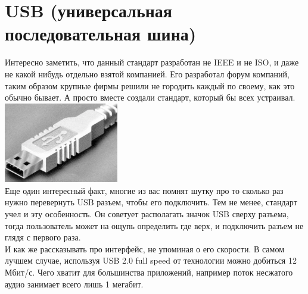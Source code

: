 \documentclass[12pt,a4paper]{article}
\begin{document}
\section{USB (универсальная последовательная шина)}
    Интересно заметить, что данный стандарт разработан не IEEE и не ISO, и
    даже не какой нибудь отдельно взятой компанией. Его разработал форум
    компаний, таким образом крупные фирмы решили не городить каждый по своему,
    как это обычно бывает. А просто вместе создали стандарт, который
    бы всех устраивал.\\
\includegraphics[width=5cm]{plug.png}\\
    Еще один интересный факт, многие из вас помнят шутку про то сколько раз нужно
    перевернуть USB разъем, чтобы его подключить. Тем не менее, стандарт
    учел и эту особенность. Он советует располагать значок USB сверху разъема,
    тогда пользователь может на ощупь определить где верх, и подключить разъем
    не глядя с первого раза.\\
    И как же рассказывать про интерфейс, не упоминая о его скорости.
    В самом лучшем случае, используя USB 2.0 full speed от технологии можно
    добиться 12 Мбит/с. Чего хватит для большинства приложений, например поток
    несжатого аудио занимает всего лишь 1 мегабит.
\end{document}
